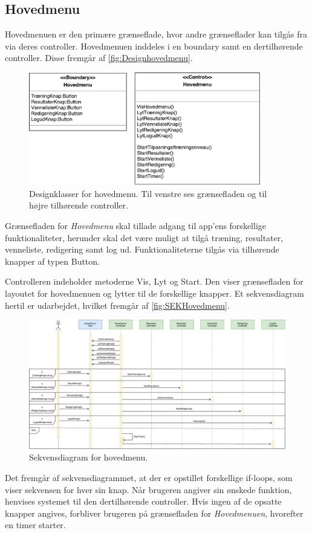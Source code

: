 \subsection*{Hovedmenu} \label{sec:MVCHovedmenu}
Hovedmenuen er den primære grænseflade, hvor andre grænseflader kan tilgås fra via deres controller.
Hovedmenuen inddeles i en boundary samt en dertilhørende controller. Disse fremgår af \autoref{fig:Designhovedmenu}.

\begin{figure} [H]
\centering
\includegraphics[width=0.9\textwidth]{figures/MVC/MVCHovedmenu}
\caption{Designklasser for hovedmenu. Til venstre ses grænsefladen og til højre tilhørende controller.}
\label{fig:Designhovedmenu}
\end{figure}

\noindent
Grænsefladen for \textit{Hovedmenu} skal tillade adgang til app'ens forskellige funktionaliteter, herunder skal det være muligt at tilgå træning, resultater, venneliste, redigering samt log ud. Funktionaliteterne tilgås via tilhørende knapper af typen Button. 

Controlleren indeholder metoderne Vis, Lyt og Start. Den viser grænsefladen for layoutet for hovedmenuen og lytter til de forskellige knapper. Et sekvensdiagram hertil er udarbejdet, hvilket fremgår af \autoref{fig:SEKHovedmenu}. 

\begin{figure} [H]
\centering
\includegraphics[width=1.5\textwidth, angle=90]{figures/Sek/SEKHovedmenu}
\caption{Sekvensdiagram for hovedmenu. }
\label{fig:SEKHovedmenu}
\end{figure}

\noindent
Det fremgår af sekvensdiagrammet, at der er opstillet forskellige if-loops, som viser sekvensen for hver sin knap. Når brugeren angiver sin ønskede funktion, henvises systemet til den dertilhørende controller. Hvis ingen af de opsatte knapper angives, forbliver brugeren på grænsefladen for \textit{Hovedmenuen}, hvorefter en timer starter. 